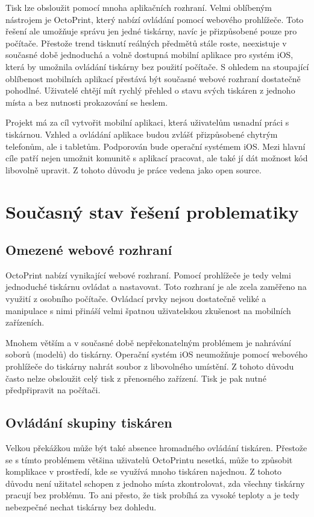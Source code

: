 \documentclass[czech]{article}
\begin{document}
Tisk lze obsloužit pomocí mnoha aplikačních rozhraní. Velmi oblíbeným nástrojem je OctoPrint, který nabízí ovládání pomocí webového prohlížeče. Toto řešení ale umožňuje správu jen jedné tiskárny, navíc je přizpůsobené pouze pro počítače. Přestože trend tisknutí reálných předmětů stále roste, neexistuje v současné době jednoduchá a volně dostupná mobilní aplikace pro systém iOS, která by umožnila ovládání tiskárny bez použití počítače. S ohledem na stoupající oblíbenost mobilních aplikací přestává být současné webové rozhraní dostatečně pohodlné. Uživatelé chtějí mít rychlý přehled o stavu svých tiskáren z jednoho místa a bez nutnosti prokazování se heslem.

Projekt má za cíl vytvořit mobilní aplikaci, která uživatelům usnadní práci s tiskárnou. Vzhled a ovládání aplikace budou zvlášť přizpůsobené chytrým telefonům, ale i tabletům. Podporován bude operační systémem iOS. Mezi hlavní cíle patří nejen umožnit komunitě s aplikací pracovat, ale také jí dát možnost kód libovolně upravit. Z tohoto důvodu je práce vedena jako open source.

\section{Současný stav řešení problematiky}

\subsection{Omezené webové rozhraní}

OctoPrint nabízí vynikající webové rozhraní. Pomocí prohlížeče je tedy velmi jednoduché tiskárnu ovládat a nastavovat. Toto rozhraní je ale zcela zaměřeno na využití z osobního počítače. Ovládací prvky nejsou dostatečně veliké a manipulace s nimi přináší velmi špatnou uživatelskou zkušenost na mobilních zařízeních.

Mnohem větším a v současné době nepřekonatelným problémem je nahrávání soborů (modelů) do tiskárny. Operační systém iOS neumožňuje pomocí webového prohlížeče do tiskárny nahrát soubor z libovolného umístění. Z tohoto důvodu často nelze obsloužit celý tisk z přenosného zařízení. Tisk je pak nutné předpřipravit na počítači.

\subsection{Ovládání skupiny tiskáren}

Velkou překážkou může být také absence hromadného ovládání tiskáren. Přestože se s tímto problémem většina uživatelů OctoPrintu nesetká, může to způsobit komplikace v prostředí, kde se využívá mnoho tiskáren najednou. Z tohoto důvodu není užitatel schopen z jednoho místa zkontrolovat, zda všechny tiskárny pracují bez problému. To ani přesto, že tisk probíhá za vysoké teploty a je tedy nebezpečné nechat tiskárny bez dohledu.
\end{document}
